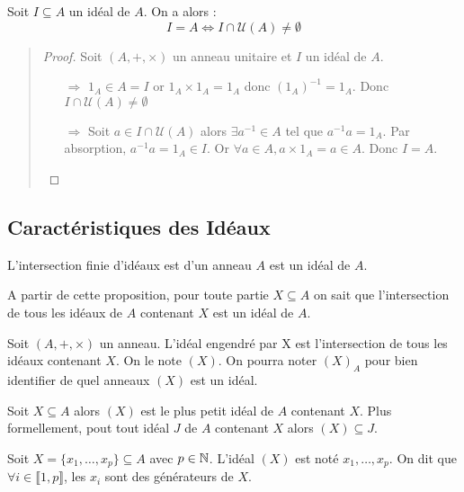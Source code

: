 \begin{theorem}
    Soit $I \subseteq A$ un idéal de $A$. On a alors :
        \[ I = A \iff I \cap \mathcal{U}(A) \not = \emptyset \] 
\end{theorem}

\begin{quote}
\begin{footnotesize}
    \begin{proof}
        Soit $(A,+,\times)$ un anneau unitaire et $I$ un idéal de $A$. 
        \begin{itemize}
            \item[$\boxed{\Rightarrow}$] $1_A \in A = I$ or $1_A \times 1_A = 1_A$ donc $(1_A)^{-1} = 1_A$. Donc $ I \cap \mathcal{U}(A) \not = \emptyset $
            \item[$\boxed{\Rightarrow}$] Soit $a \in I \cap \mathcal{U}(A)$ alors $ \exists a^{-1} \in A$ tel que $a^{-1}a = 1_A$. 
            Par absorption, $a^{-1}a = 1_A \in I$. Or $ \forall a \in A, a \times 1_A = a \in A$. Donc $I = A$. 
        \end{itemize}
    \end{proof}
\end{footnotesize}
\end{quote}

\subsection{Caractéristiques des Idéaux}

\begin{proposition}
    L'intersection finie d'idéaux est d'un anneau $A$ est un idéal de $A$. 
\end{proposition}

A partir de cette proposition, pour toute partie $X \subseteq A$ on sait que l'intersection de tous les idéaux de $A$ contenant 
$X$ est un idéal de $A$. 

\begin{definition}
    Soit $(A,+,\times)$ un anneau. L'idéal engendré par X est l'intersection de tous les idéaux contenant $X$. On le note $(X)$. 
    On pourra noter $(X)_A$ pour bien identifier de quel anneaux $(X)$ est un idéal. 
\end{definition}

\begin{remark}
    Soit $X \subseteq A$ alors $(X)$ est le plus petit idéal de $A$ contenant $X$. Plus formellement, pout tout idéal $J$ de $A$ contenant $X$ 
    alors $(X) \subseteq J$. 

    \vspace{0.3cm}

    Soit $X = \{ x_1, \dots, x_p \} \subseteq A$ avec $p \in \mathbb{N}$. L'idéal $(X)$ est noté $x_1, \dots, x_p$. 
    On dit que $ \forall i \in \llbracket 1, p \rrbracket$, les $x_i$ sont des générateurs de $X$. 
\end{remark}

